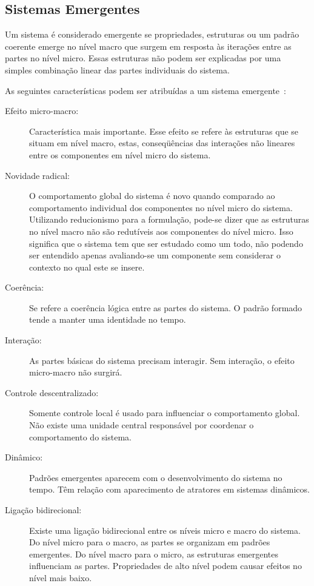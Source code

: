 \subsection{Sistemas Emergentes}

Um sistema é considerado emergente se propriedades, estruturas ou um padrão coerente emerge no nível macro que surgem em resposta às iterações entre as partes no nível micro. Essas estruturas não podem ser explicadas por uma simples combinação linear das partes individuais do sistema.

As seguintes características podem ser atribuídas a um sistema emergente~\cite{DeWolf2005a}:
\begin{description}

 \item [Efeito micro-macro:] Característica mais importante.%
Esse efeito se refere às estruturas que se situam em nível macro, estas, conseqüências das interações não lineares entre os componentes em nível micro do sistema.

 \item[Novidade radical:] O comportamento global do sistema é novo quando comparado ao comportamento individual dos componentes no nível micro do sistema. Utilizando reducionismo para a formulação, pode-se dizer que as estruturas no nível macro não são redutíveis aos componentes do nível micro. Isso significa que o sistema tem que ser estudado como um todo, não podendo ser entendido apenas avaliando-se um componente sem considerar o contexto no qual este se insere.

\item[Coerência:] Se refere a coerência lógica entre as partes do sistema. O padrão formado tende a manter uma identidade no tempo.

\item[Interação:] As partes básicas do sistema precisam interagir. Sem interação, o efeito micro-macro não surgirá.

\item[Controle descentralizado:] Somente controle local é usado para influenciar o comportamento global. Não existe uma unidade central responsável por coordenar o comportamento do sistema.

\item[Dinâmico:] Padrões emergentes aparecem com o desenvolvimento do sistema no tempo. Têm relação com aparecimento de atratores em sistemas dinâmicos.

\item[Ligação bidirecional:] Existe uma ligação bidirecional entre os níveis micro e macro do sistema. Do nível micro para o macro, as partes se organizam em padrões emergentes. Do nível macro para o micro, as estruturas emergentes influenciam as partes. Propriedades de alto nível podem causar efeitos no nível mais baixo.


\end{description}
